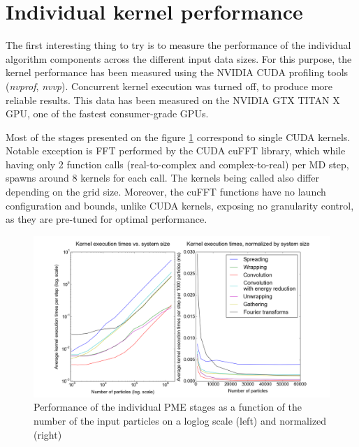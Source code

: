 \documentclass[12pt,a4paper]{report}
\newcommand{\draft}[1]{#1}
\begin{document}


\section{Individual kernel performance} \label{chapter_kernels}

The first interesting thing to try is to measure the performance of the individual algorithm components across the different input data sizes.
For this purpose, the kernel performance has been measured using the NVIDIA CUDA profiling tools (\textit{nvprof}, \textit{nvvp}). Concurrent kernel execution was turned off, to produce more reliable results.
This data has been measured on the NVIDIA GTX TITAN X GPU, one of the fastest consumer-grade GPUs.



Most of the stages presented on the figure \ref{fig:kernels} correspond to single CUDA kernels. Notable exception is FFT performed by the CUDA cuFFT library, which while having only 2 function calls (real-to-complex and complex-to-real) per MD step, spawns around 8 kernels for each call. The kernels being called also differ depending on the grid size. Moreover, the cuFFT functions have no \draft{launch configuration} and \draft{bounds}, unlike CUDA kernels, exposing no granularity control, as they are pre-tuned for optimal performance. 

\begin{figure} [h!]
    \centering
    \includegraphics[width=1\textwidth]{pics/kernels-noconcur.png}
    \caption{Performance of the individual PME stages as a function of the number of the input particles on a loglog scale (left) and normalized (right)}
    \label{fig:kernels}
\end{figure}
\end{document}
